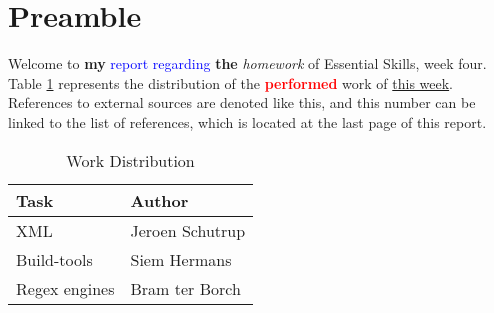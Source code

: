 \section{Preamble}
Welcome to \textbf{my} \textcolor{blue}{report regarding} \textbf{the} \textit{homework} of Essential Skills, week four. Table \ref{table:distribution} represents the distribution of the \textbf{\textcolor{red}{performed}} work of \underline{this week}. References to external sources are denoted like this\cite[99]{Silberschatz:Galvin:2009}, and this number can be linked to the list of references, which is located at the last page of this report.

\begin{table}[h]
\begin{center}
\begin{tabular}{ | l | l | }
	\hline
	\textbf{Task}	&	\textbf{Author}	\\
	\hline
	XML		&	Jeroen Schutrup		\\
	\hline
	Build-tools	&	Siem Hermans		\\
	\hline
	Regex engines	&	Bram ter Borch		\\
	\hline
\end{tabular}
\caption{Work Distribution}
\label{table:distribution}
\end{center}
\end{table}
